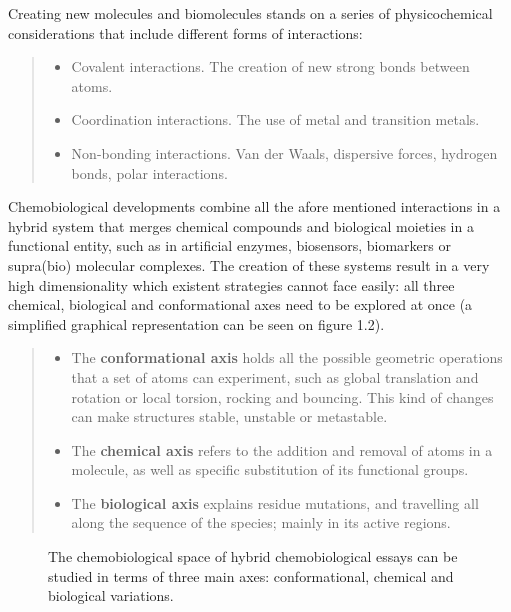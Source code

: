 Creating new molecules and biomolecules stands on a series of physicochemical considerations that include different forms of interactions:
%
\begin{quote}
%
\begin{itemize}

\item Covalent interactions. The creation of new strong bonds between atoms.

\item Coordination interactions. The use of metal and transition metals.

\item Non-bonding interactions. Van der Waals, dispersive forces, hydrogen bonds, polar interactions.

\end{itemize}

\end{quote}

Chemobiological developments combine all the afore mentioned interactions in a hybrid system that merges chemical compounds and biological moieties in a functional entity, such as in artificial enzymes, biosensors, biomarkers or supra(bio) molecular complexes. The creation of these systems result in a very high dimensionality which existent strategies cannot face easily: all three chemical, biological and conformational axes need to be explored at once (a simplified graphical representation can be seen on figure 1.2).
%
\begin{quote}
%
\begin{itemize}

\item The \textbf{conformational axis} holds all the possible geometric operations that a set of atoms can experiment, such as global translation and rotation or local torsion, rocking and bouncing. This kind of changes can make structures stable, unstable or metastable.

\item The \textbf{chemical axis} refers to the addition and removal of atoms in a molecule, as well as specific substitution of its functional groups.

\item The \textbf{biological axis} explains residue mutations, and travelling all along the sequence of the species; mainly in its active regions.

\end{itemize}

\end{quote}
\begin{figure}
\noindent{}
\caption[A highly dimensional search space]{The chemobiological space of hybrid chemobiological essays can be studied in terms of three main axes: conformational, chemical and biological variations.}
\end{figure}

